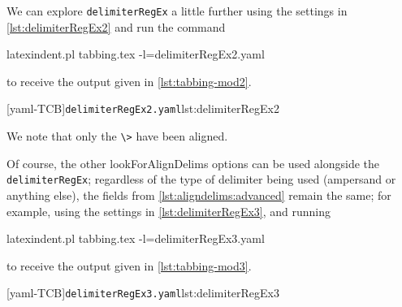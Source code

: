  \begin{example}
 We can explore \texttt{delimiterRegEx} a little further using the settings in
 \cref{lst:delimiterRegEx2} and run the command 

 \begin{commandshell}
latexindent.pl tabbing.tex -l=delimiterRegEx2.yaml
\end{commandshell}

 to receive the output given in \cref{lst:tabbing-mod2}. 

 \begin{cmhtcbraster}
  [yaml-TCB]{\texttt{delimiterRegEx2.yaml}}{lst:delimiterRegEx2}
 \end{cmhtcbraster}
 We note that only the \lstinline!\>! have been aligned.
 \end{example}

 \begin{example}
 Of course, the other lookForAlignDelims options can be used alongside the
 \texttt{delimiterRegEx}; regardless of the type of delimiter being used (ampersand or
 anything else), the fields from \vref{lst:aligndelims:advanced} remain the same; for
 example, using the settings in \cref{lst:delimiterRegEx3}, and running 

 \begin{commandshell}
latexindent.pl tabbing.tex -l=delimiterRegEx3.yaml
\end{commandshell}

 to receive the output given in \cref{lst:tabbing-mod3}.

 \begin{cmhtcbraster}
  [yaml-TCB]{\texttt{delimiterRegEx3.yaml}}{lst:delimiterRegEx3}
 \end{cmhtcbraster}
 \end{example}

